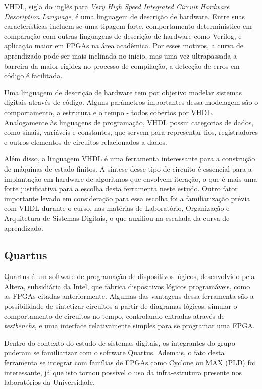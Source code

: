 	VHDL, sigla do inglês para \textit{Very High Speed Integrated Circuit Hardware Description Language}, é uma linguagem de descrição de hardware. Entre suas características incluem-se uma tipagem forte, comportamento determinístico em comparação com outras linguagens de descrição de hardware como Verilog, e aplicação maior em FPGAs na área acadêmica. Por esses motivos, a curva de aprendizado pode ser mais inclinada no início, mas uma vez ultrapassada a barreira da maior rigidez no processo de compilação, a detecção de erros em código é facilitada.

	Uma linguagem de descrição de hardware tem por objetivo modelar sistemas digitais através de código. Alguns parâmetros importantes dessa modelagem são o comportamento, a estrutura e o tempo - todos cobertos por VHDL. Analogamente às linguagens de programação, VHDL possui categorias de dados, como sinais, variáveis e constantes, que servem para representar fios, registradores e outros elementos de circuitos relacionados a dados.

	Além disso, a linguagem VHDL é uma ferramenta interessante para a construção de máquinas de estado finitos. A síntese desse tipo de circuito é essencial para a implantação em hardware de algoritmos que envolvem iteração, o que é mais uma forte justificativa para a escolha desta ferramenta neste estudo. Outro fator importante levado em consideração para essa escolha foi a familiarização prévia com VHDL durante o curso, nas matérias de Laboratório, Organização e Arquitetura de Sistemas Digitais, o que auxiliou na escalada da curva de aprendizado.

	\subsection{Quartus}\label{soft-quartus}

	Quartus é um software de programação de dispositivos lógicos, desenvolvido pela Altera, subsidiária da Intel, que fabrica dispositivos lógicos programáveis, como as FPGAs citadas anteriormente. Algumas das vantagens dessa ferramenta são a possibilidade de sintetizar circuitos a partir de diagramas lógicos,  simular o comportamento de circuitos no tempo, controlando entradas através de \textit{testbenchs}, e uma interface relativamente simples para se programar uma FPGA.

	Dentro do contexto do estudo de sistemas digitais, os integrantes do grupo puderam se familiarizar com o software Quartus. Ademais, o fato desta ferramenta se integrar com famílias de FPGAs como Cyclone ou MAX (PLD) foi interessante, já que isto tornou possível o uso da infra-estrutura presente nos laboratórios da Universidade.
